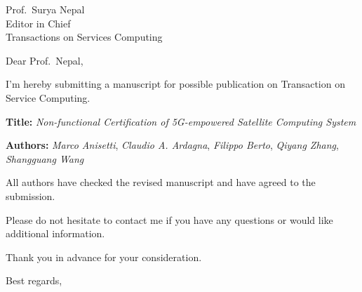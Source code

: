 \topmargin 0in\textheight 8in
\oddsidemargin 0.25in\textwidth 5.75in



\signature{\vspace*{-1.4cm}\\
	Marco Anisetti}


\begin{letter}{%
		Prof.\ Surya Nepal\\
		Editor in Chief\\
		Transactions on Services Computing
	}

	\opening{Dear Prof.\ Nepal,}

	I'm hereby submitting a manuscript for possible publication on Transaction on Service Computing.

		{\bf Title:} {\it Non-functional Certification of 5G-empowered
			Satellite Computing System\/}

		{\bf Authors:} {\it Marco Anisetti}, {\it Claudio A. Ardagna}, {\it Filippo Berto}, {\it Qiyang Zhang}, {\it Shangguang Wang\/}




	All authors have checked the revised manuscript and have agreed to the submission.

	Please do not hesitate to contact me if you have any questions or would like additional information.

	Thank you in advance for your consideration.

	\closing{Best regards,}

\end{letter}


